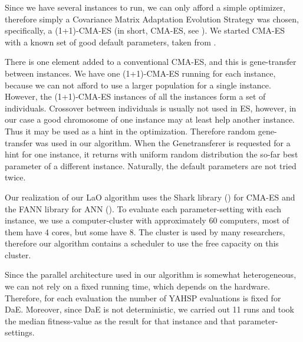 \documentclass{article}
\begin{document}
Since we have several instances to run, we can only afford a simple optimizer, therefore simply a Covariance Matrix Adaptation Evolution Strategy was chosen, specifically, a (1+1)-CMA-ES (in short, CMA-ES, see \cite{hansen2001ecj}). We started CMA-ES with a known set of good default parameters, taken from \cite{BibGECCO:2010}.

There is one element added to a conventional CMA-ES, and this is gene-transfer between instances. We have one (1+1)-CMA-ES running for each instance, because we can not afford to use a larger population for a single instance. However, the (1+1)-CMA-ES instances of all the instances form a set of individuals. Crossover between individuals is usually not used in ES, however, in our case a good chromosome of one instance may at least help another instance. Thus it may be used as a hint in the optimization. Therefore random gene-transfer was used in our algorithm. When the Genetransferer is requested for a hint for one instance, it returns with uniform random distribution the so-far best parameter of a different instance. Naturally, the default parameters are not tried twice.

Our realization of our LaO algorithm uses the Shark library (\cite{shark08}) for CMA-ES and the FANN library for ANN (\cite{nissen}). To evaluate each parameter-setting with each instance, we use a computer-cluster with approximately 60 computers, most of them have 4 cores, but some have 8. The cluster is used by many researchers, therefore our algorithm contains a scheduler to use the free capacity on this cluster.

Since the parallel architecture used in our algorithm is somewhat heterogeneous, we can not rely on a fixed running time, which depends on the hardware. Therefore, for each evaluation the number of YAHSP evaluations is fixed for DaE. Moreover, since DaE is not deterministic, we carried out 11 runs and took the median fitness-value as the result for that instance and that parameter-settings.
\end{document}
